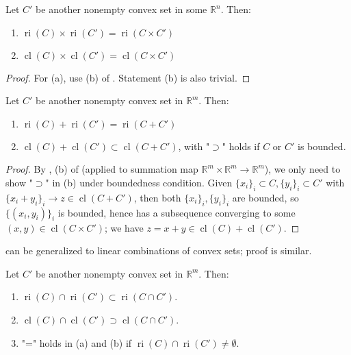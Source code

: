 \begin{prop}
	\label{prop:012-product-rules}
	Let $C'$ be another nonempty convex set in some $\mathbb{R}^n$. Then:
	\begin{enumerate}[label=(\alph*)]
		\item $\operatorname{ri}(C)\times\operatorname{ri}(C')=\operatorname{ri}(C\times C')$
		\item $\operatorname{cl}(C)\times\operatorname{cl}(C')=\operatorname{cl}(C\times C')$
	\end{enumerate}
\end{prop}

\begin{proof}
	For (a), use (b) of . Statement (b) is also trivial.
\end{proof}

\begin{prop}
	\label{prop:012-sum-rules}
	Let $C'$ be another nonempty convex set in $\mathbb{R}^m$. Then:
	\begin{enumerate}[label=(\alph*)]
		\item $\operatorname{ri}(C)+\operatorname{ri}(C')=\operatorname{ri}(C+C')$
		\item $\operatorname{cl}(C)+\operatorname{cl}(C')\subset\operatorname{cl}(C+C')$, with "$\supset$" holds if $C$ or $C'$ is bounded.
	\end{enumerate}
\end{prop}

\begin{proof}
	By , (b) of  (applied to summation map $\mathbb{R}^{m}\times\mathbb{R}^{m}\to \mathbb{R}^m$), we only need to show "$\supset$" in (b) under boundedness condition. Given $\{x_i\}_i\subset C,\{y_i\}_i\subset C'$ with $\{x_i+y_i\}_i\to z\in \operatorname{cl}(C+C')$, then both $\{x_i\}_i,\{y_i\}_i$ are bounded, so $\{(x_i,y_i)\}_i$ is bounded, hence has a subsequence converging to some $(x,y)\in \operatorname{cl}(C\times C')$; we have $z=x+y\in \operatorname{cl}(C)+\operatorname{cl}(C')$.
\end{proof}

\begin{rmrk}
	 can be generalized to linear combinations of convex sets; proof is similar.
\end{rmrk}

\begin{prop}
	\label{prop:012-fin-intersection-rules}
	Let $C'$ be another nonempty convex set in $\mathbb{R}^m$. Then:
	\begin{enumerate}[label=(\alph*)]
		\item $\operatorname{ri}(C)\cap\operatorname{ri}(C')\subset\operatorname{ri}(C\cap C')$.
		\item $\operatorname{cl}(C)\cap\operatorname{cl}(C')\supset\operatorname{cl}(C\cap C')$.
		\item "=" holds in (a) and (b) if $\operatorname{ri}(C)\cap\operatorname{ri}(C')\neq\emptyset$.
	\end{enumerate}
\end{prop}

